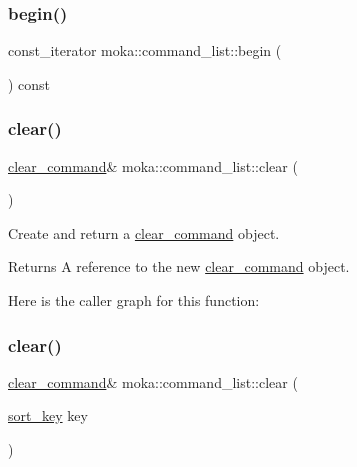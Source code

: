 \subsubsection{\texorpdfstring{begin()}{begin()}\hspace{0.1cm}{\footnotesize\ttfamily [2/2]}}
{\footnotesize\ttfamily const\+\_\+iterator moka\+::command\+\_\+list\+::begin (\begin{DoxyParamCaption}{ }\end{DoxyParamCaption}) const}

\mbox{\label{classmoka_1_1command__list_a4ca381ed2350bb80861e6c4925103a19}} 
\subsubsection{\texorpdfstring{clear()}{clear()}\hspace{0.1cm}{\footnotesize\ttfamily [1/2]}}
{\footnotesize\ttfamily \mbox{\hyperlink{classmoka_1_1clear__command}{clear\+\_\+command}}\& moka\+::command\+\_\+list\+::clear (\begin{DoxyParamCaption}{ }\end{DoxyParamCaption})}



Create and return a \mbox{\hyperlink{classmoka_1_1clear__command}{clear\+\_\+command}} object. 

\begin{DoxyReturn}{Returns}
A reference to the new \mbox{\hyperlink{classmoka_1_1clear__command}{clear\+\_\+command}} object. 
\end{DoxyReturn}
Here is the caller graph for this function\+:
\mbox{\label{classmoka_1_1command__list_a58f8547711d66b610ba2c2086919a064}} 
\subsubsection{\texorpdfstring{clear()}{clear()}\hspace{0.1cm}{\footnotesize\ttfamily [2/2]}}
{\footnotesize\ttfamily \mbox{\hyperlink{classmoka_1_1clear__command}{clear\+\_\+command}}\& moka\+::command\+\_\+list\+::clear (\begin{DoxyParamCaption}\item[{\mbox{\hyperlink{namespacemoka_afa30a616e67b83113ebdb857555cf2bb}{sort\+\_\+key}}}]{key }\end{DoxyParamCaption})}



